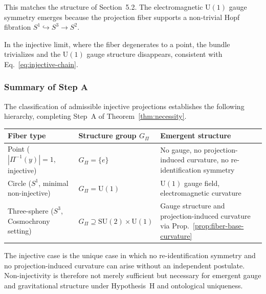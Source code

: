     This matches the structure of Section~5.2.
    The electromagnetic $\mathrm{U}(1)$ gauge symmetry emerges because the projection fiber supports a non-trivial
    Hopf fibration $S^1 \hookrightarrow S^3 \to S^2$.

    In the injective limit, where the fiber degenerates to a point, the bundle trivializes and the $\mathrm{U}(1)$ gauge
    structure disappears, consistent with Eq.~\eqref{eq:injective-chain}.

  \subsubsection*{Summary of Step A}
    \label{subsec:stepA-summary}

    The classification of admissible injective projections establishes the following hierarchy,
    completing Step~A of Theorem~\ref{thm:necessity}.

    \begin{center}
      \begin{tabular}{lll}
        \hline
        Fiber type & Structure group $G_\Pi$ & Emergent structure \\
        \hline
        Point ($|\Pi^{-1}(y)| = 1$, injective)
        & $G_\Pi = \{e\}$
        & No gauge, no projection-induced curvature, no re-identification symmetry \\
        Circle ($S^1$, minimal non-injective)
        & $G_\Pi = \mathrm{U}(1)$
        & $\mathrm{U}(1)$ gauge field, electromagnetic curvature \\
        Three-sphere ($S^3$, Cosmochrony setting)
        & $G_\Pi \supseteq \mathrm{SU}(2) \times \mathrm{U}(1)$
        & Gauge structure and projection-induced curvature via Prop.~\ref{prop:fiber-base-curvature} \\
        \hline
      \end{tabular}
    \end{center}

    The injective case is the unique case in which no re-identification symmetry and no projection-induced curvature can arise
    without an independent postulate.
    Non-injectivity is therefore not merely sufficient but necessary for emergent gauge and gravitational structure under
    Hypothesis~H and ontological uniqueness.
